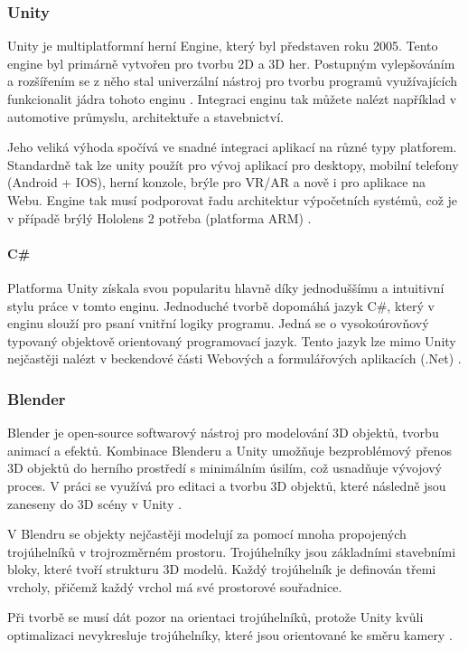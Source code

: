 \subsubsection{Unity}
Unity je multiplatformní herní Engine, který byl představen roku 2005. Tento engine byl primárně vytvořen pro tvorbu 2D a 3D her. Postupným vylepšováním a rozšířením se z něho stal univerzální nástroj pro tvorbu programů využívajících funkcionalit jádra tohoto enginu . Integraci enginu tak můžete nalézt například v automotive průmyslu, architektuře a stavebnictví.  

Jeho veliká výhoda spočívá ve snadné integraci aplikací na různé typy platforem. Standardně tak lze unity použít pro vývoj aplikací pro desktopy, mobilní telefony (Android + IOS), herní konzole, brýle pro VR/AR a nově i pro aplikace na Webu. Engine tak musí podporovat řadu architektur výpočetních systémů, což je v případě brýlý Hololens 2 potřeba (platforma ARM)  \cite{unity1,unity2}. 
\paragraph{C\#}
Platforma Unity získala svou popularitu hlavně díky jednoduššímu a intuitivní stylu práce v tomto enginu. Jednoduché tvorbě dopomáhá jazyk C\#, který v enginu slouží pro psaní vnitřní logiky programu. Jedná se o vysokoúrovňový typovaný objektově orientovaný programovací jazyk. Tento jazyk lze mimo Unity nejčastěji nalézt v beckendové části Webových a formulářových aplikacích (.Net) \cite{cSharp}. 
\subsubsection{Blender}
Blender je open-source softwarový nástroj pro modelování 3D objektů, tvorbu animací a efektů. Kombinace Blenderu a Unity umožňuje bezproblémový přenos 3D objektů do herního prostředí s minimálním úsilím, což usnadňuje vývojový proces. V práci se využívá pro editaci a tvorbu 3D objektů, které následně jsou zaneseny do 3D scény v Unity \cite{blenderUnity,blender}. 

V Blendru se objekty nejčastěji modelují za pomocí mnoha propojených trojúhelníků v trojrozměrném prostoru. Trojúhelníky jsou základními stavebními bloky, které tvoří strukturu 3D modelů. Každý trojúhelník je definován třemi vrcholy, přičemž každý vrchol má své prostorové souřadnice. 

Při tvorbě se musí dát pozor na orientaci trojúhelníků, protože Unity kvůli optimalizaci nevykresluje trojúhelníky, které jsou orientované ke směru kamery \cite{blenderUnity}.
